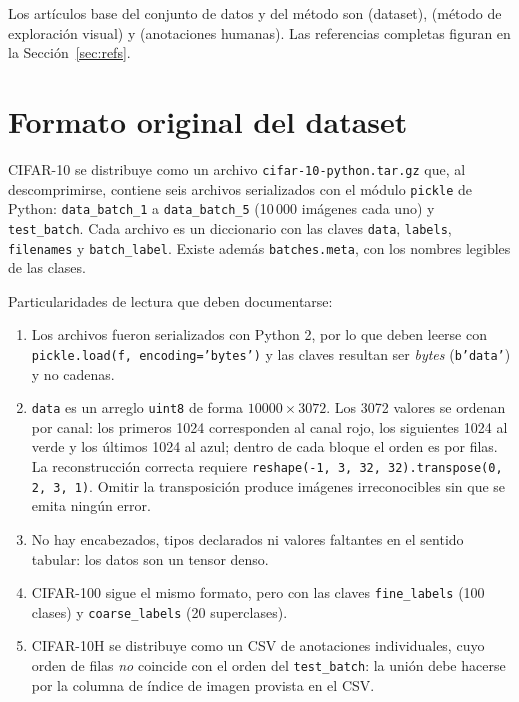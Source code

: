 \documentclass[11pt,a4paper]{article}
\begin{document}
Los artículos base del conjunto de datos y del método son
\cite{krizhevsky2009} (dataset), \cite{bertucci2023} (método de exploración
visual) y \cite{peterson2019} (anotaciones humanas). Las referencias completas
figuran en la Sección~\ref{sec:refs}.

\section{Formato original del dataset}

CIFAR-10 se distribuye como un archivo \texttt{cifar-10-python.tar.gz} que, al
descomprimirse, contiene seis archivos serializados con el módulo \texttt{pickle}
de Python: \texttt{data\_batch\_1} a \texttt{data\_batch\_5} (10\,000 imágenes
cada uno) y \texttt{test\_batch}. Cada archivo es un diccionario con las claves
\texttt{data}, \texttt{labels}, \texttt{filenames} y \texttt{batch\_label}.
Existe además \texttt{batches.meta}, con los nombres legibles de las clases.

Particularidades de lectura que deben documentarse:

\begin{enumerate}[leftmargin=*]
  \item Los archivos fueron serializados con Python 2, por lo que deben leerse con
  \texttt{pickle.load(f, encoding='bytes')} y las claves resultan ser
  \emph{bytes} (\texttt{b'data'}) y no cadenas.
  \item \texttt{data} es un arreglo \texttt{uint8} de forma $10000 \times 3072$.
  Los 3072 valores se ordenan por canal: los primeros 1024 corresponden al canal
  rojo, los siguientes 1024 al verde y los últimos 1024 al azul; dentro de cada
  bloque el orden es por filas. La reconstrucción correcta requiere
  \texttt{reshape(-1, 3, 32, 32).transpose(0, 2, 3, 1)}. Omitir la transposición
  produce imágenes irreconocibles sin que se emita ningún error.
  \item No hay encabezados, tipos declarados ni valores faltantes en el sentido
  tabular: los datos son un tensor denso.
  \item CIFAR-100 sigue el mismo formato, pero con las claves
  \texttt{fine\_labels} (100 clases) y \texttt{coarse\_labels} (20 superclases).
  \item CIFAR-10H se distribuye como un CSV de anotaciones individuales, cuyo
  orden de filas \emph{no} coincide con el orden del \texttt{test\_batch}: la
  unión debe hacerse por la columna de índice de imagen provista en el CSV.
\end{enumerate}
\end{document}
